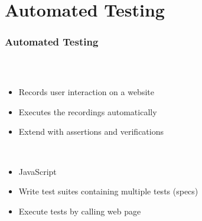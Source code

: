 \section{Automated Testing}

\begin{frame}
  \frametitle{Automated Testing}
  \begin{columns}
    \begin{column}{0.8\textwidth}
      \begin{description}[]
        \item[Frontend] \hfill \\
        \begin{itemize}
          \item Records user interaction on a website
          \item Executes the recordings automatically
          \item Extend with assertions and verifications
        \end{itemize}

        \bigskip
        \item[Backend] \hfill \\
          \begin{itemize}
            \item JavaScript
            \item Write test suites containing multiple tests (specs)
            \item Execute tests by calling web page
        \end{itemize}
      \end{description}
    \end{column}


\end{columns}
\end{frame}

